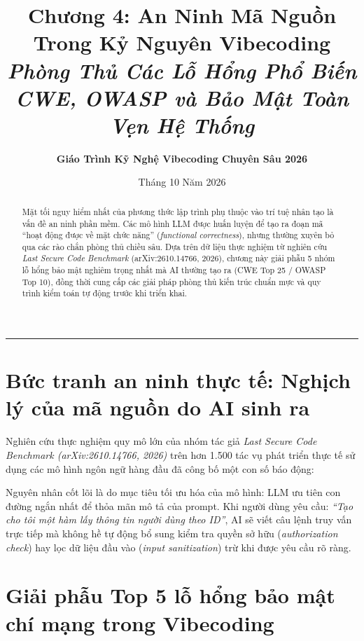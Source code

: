 \documentclass[a4paper,11pt]{article}
\title{\textbf{Chương 4: An Ninh Mã Nguồn Trong Kỷ Nguyên Vibecoding}\\[0.3em]
\large\textit{Phòng Thủ Các Lỗ Hổng Phổ Biến CWE, OWASP và Bảo Mật Toàn Vẹn Hệ Thống}}
\author{\textbf{Giáo Trình Kỹ Nghệ Vibecoding Chuyên Sâu 2026}}
\date{Tháng 10 Năm 2026}
\begin{document}
\maketitle

\begin{abstract}
Mặt tối nguy hiểm nhất của phương thức lập trình phụ thuộc vào trí tuệ nhân tạo là vấn đề an ninh phần mềm. Các mô hình LLM được huấn luyện để tạo ra đoạn mã ``hoạt động được về mặt chức năng'' (\textit{functional correctness}), nhưng thường xuyên bỏ qua các rào chắn phòng thủ chiều sâu. Dựa trên dữ liệu thực nghiệm từ nghiên cứu \textit{Last Secure Code Benchmark} (arXiv:2610.14766, 2026), chương này giải phẫu 5 nhóm lỗ hổng bảo mật nghiêm trọng nhất mà AI thường tạo ra (CWE Top 25 / OWASP Top 10), đồng thời cung cấp các giải pháp phòng thủ kiến trúc chuẩn mực và quy trình kiểm toán tự động trước khi triển khai.
\end{abstract}

\vspace{1em}
\rule{\textwidth}{0.4pt}

\section{Bức tranh an ninh thực tế: Nghịch lý của mã nguồn do AI sinh ra}

Nghiên cứu thực nghiệm quy mô lớn của nhóm tác giả \textit{Last Secure Code Benchmark (arXiv:2610.14766, 2026)} trên hơn 1.500 tác vụ phát triển thực tế sử dụng các mô hình ngôn ngữ hàng đầu đã công bố một con số báo động:
\begin{center}
\end{center}

Nguyên nhân cốt lõi là do mục tiêu tối ưu hóa của mô hình: LLM ưu tiên con đường ngắn nhất để thỏa mãn mô tả của prompt. Khi người dùng yêu cầu: \textit{``Tạo cho tôi một hàm lấy thông tin người dùng theo ID''}, AI sẽ viết câu lệnh truy vấn trực tiếp mà không hề tự động bổ sung kiểm tra quyền sở hữu (\textit{authorization check}) hay lọc dữ liệu đầu vào (\textit{input sanitization}) trừ khi được yêu cầu rõ ràng.

\section{Giải phẫu Top 5 lỗ hổng bảo mật chí mạng trong Vibecoding}
\end{document}
